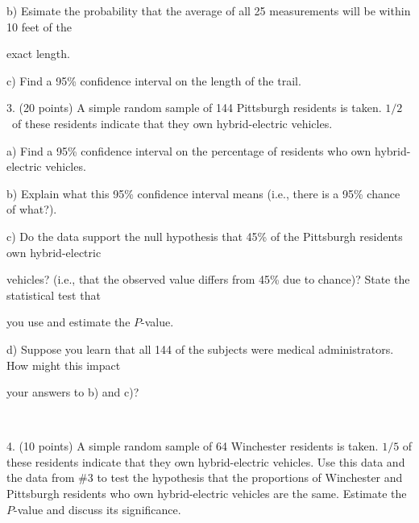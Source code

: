 \documentclass[10pt]{article}
\newcommand{\HH}{\hspace{10pt}\hphantom{a) } }
\begin{document}
\hspace{10pt} b) Esimate the probability that the average of all 25 measurements
will be within 10 feet of the\vspace{-4pt}

\HH exact length.
\vspace{1.2in}

\hspace{10pt} c) Find a 95\% confidence interval on the length  of the trail.

\vfill
\eject


3. (20 points)
A simple random sample of 144 Pittsburgh residents is taken.  
$1/2$~of these residents indicate that they own hybrid-electric vehicles.

\hspace{10pt} a) Find a 95\% confidence interval on the percentage of residents
who own hybrid-electric vehicles.
\vspace{1.5in}

\hspace{10pt} b) Explain what this 95\% confidence interval means (i.e., there is
a 95\% chance of what?).
\vspace{1.5in}


\hspace{10pt} c) Do the data support the null hypothesis that
45\% of the
  Pittsburgh residents own hybrid-electric\vspace{-4pt}

  \HH  vehicles? (i.e., that the observed value differs from 45\% due to chance)?
State the statistical test that\vspace{-4pt}

\HH you use and estimate the $P$-value.
\vspace{2.5in}


\hspace{10pt} d) Suppose you learn that all 144 of the subjects were 
medical administrators.  How might this impact \vspace{-4pt}

\HH your answers to b) and c)?
\vspace{-4pt}

\vfill
\eject
{\ }

4. (10 points) A simple random sample of 64 Winchester residents is taken.
$1/5$ of these residents indicate that they own hybrid-electric vehicles.
Use this data and the data from \#3 to 
test the hypothesis that the proportions of Winchester and Pittsburgh residents  who
own hybrid-electric vehicles are the same.
Estimate the $P$-value and discuss its significance.
\vspace{4in}
\end{document}
